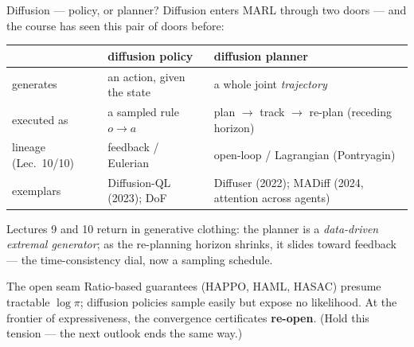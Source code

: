 \documentclass[10pt, aspectratio=169]{beamer}
\begin{document}
\begin{frame}{Diffusion --- policy, or planner?}
Diffusion enters MARL through \alert{two doors} --- and the course has seen this pair of doors before:
\smallskip
\begin{center}\footnotesize\renewcommand{\arraystretch}{1.35}
\begin{tabular}{l|l|l}
 & \textbf{diffusion policy} & \textbf{diffusion planner} \\
\hline
generates & an action, given the state & a whole joint \emph{trajectory} \\
executed as & a sampled rule $o \to a$ & plan $\to$ track $\to$ \alert{re-plan} (receding horizon) \\
lineage (Lec.\ 10/10) & \alert{feedback} / Eulerian & \alert{open-loop} / Lagrangian (Pontryagin) \\
exemplars & Diffusion-QL (2023); \alert{DoF} & Diffuser (2022); \alert{MADiff} (2024, attention across agents) \\
\end{tabular}
\end{center}
\smallskip

\pause
Lectures 9 and 10 return in generative clothing: the planner is a \emph{data-driven extremal generator}; as the re-planning horizon shrinks, it slides toward feedback --- the time-consistency dial, now a \alert{sampling schedule}.
\smallskip

\pause
\begin{block}{The open seam}
Ratio-based guarantees (HAPPO, HAML, HASAC) presume tractable $\log\pi$; diffusion policies sample easily but \alert{expose no likelihood}. At the frontier of expressiveness, the convergence certificates \textbf{re-open}. {\footnotesize(Hold this tension --- the next outlook ends the same way.)}
\end{block}
\end{frame}
\end{document}
